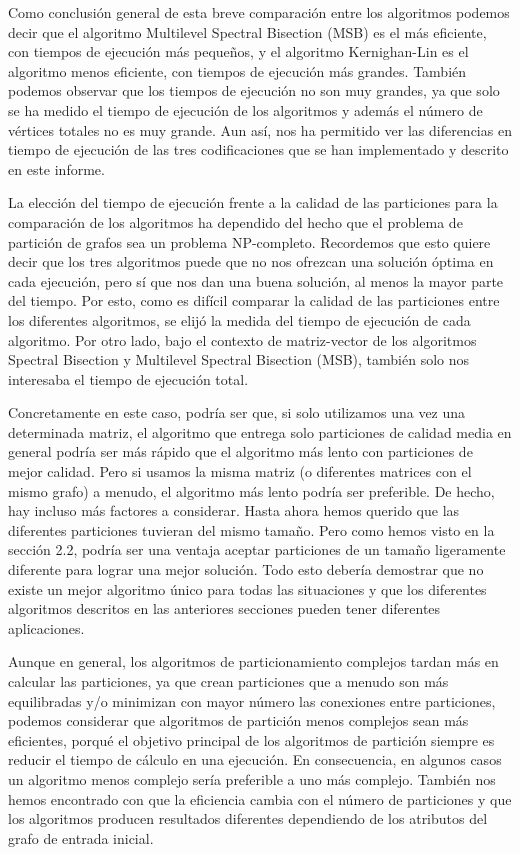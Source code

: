 Como conclusión general de esta breve comparación entre los algoritmos podemos decir que el algoritmo Multilevel Spectral Bisection (MSB) es el más eficiente, con tiempos de ejecución más pequeños, y el algoritmo Kernighan-Lin es el algoritmo menos eficiente, con tiempos de ejecución más grandes. También podemos observar que los tiempos de ejecución no son muy grandes, ya que solo se ha medido el tiempo de ejecución de los algoritmos y además el número de vértices totales no es muy grande. Aun así, nos ha permitido ver las diferencias en tiempo de ejecución de las tres codificaciones que se han implementado y descrito en este informe.

La elección del tiempo de ejecución frente a la calidad de las particiones para la comparación de los algoritmos ha dependido del hecho que el problema de partición de grafos sea un problema NP-completo\cite{NPCompleteness}. Recordemos que esto quiere decir que los tres algoritmos puede que no nos ofrezcan una solución óptima en cada ejecución, pero sí que nos dan una buena solución, al menos la mayor parte del tiempo. Por esto, como es difícil comparar la calidad de las particiones entre los diferentes algoritmos, se elijó la medida del tiempo de ejecución de cada algoritmo. Por otro lado, bajo el contexto de matriz-vector de los algoritmos Spectral Bisection y Multilevel Spectral Bisection (MSB), también solo nos interesaba el tiempo de ejecución total. 

Concretamente en este caso, podría ser que, si solo utilizamos una vez una determinada matriz, el algoritmo que entrega solo particiones de calidad media en general podría ser más rápido que el algoritmo más lento con particiones de mejor calidad. Pero si usamos la misma matriz (o diferentes matrices con el mismo grafo) a menudo, el algoritmo más lento podría ser preferible. De hecho, hay incluso más factores a considerar. Hasta ahora hemos querido que las diferentes particiones tuvieran del mismo tamaño. Pero como hemos visto en la sección 2.2, podría ser una ventaja aceptar particiones de un tamaño ligeramente diferente para lograr una mejor solución. Todo esto debería demostrar que no existe un mejor algoritmo único para todas las situaciones y que los diferentes algoritmos descritos en las anteriores secciones pueden tener diferentes aplicaciones.

Aunque en general, los algoritmos de particionamiento complejos tardan más en calcular las particiones, ya que crean particiones que a menudo son más equilibradas y/o minimizan con mayor número las conexiones entre particiones, podemos considerar que algoritmos de partición menos complejos sean más eficientes, porqué el objetivo principal de los algoritmos de partición siempre es reducir el tiempo de cálculo en una ejecución. En consecuencia, en algunos casos un algoritmo menos complejo sería preferible a uno más complejo. También nos hemos encontrado con que la eficiencia cambia con el número de particiones y que los algoritmos producen resultados diferentes dependiendo de los atributos del grafo de entrada inicial.